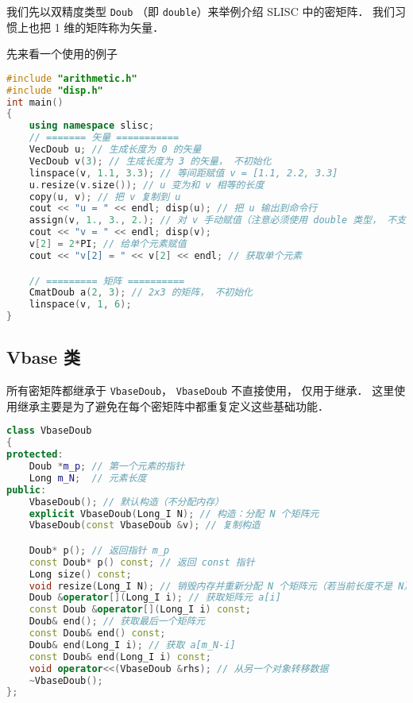 
\begin{issues}
\issueDraft
\end{issues}


我们先以双精度类型 \verb|Doub| （即 \verb|double|）来举例介绍 SLISC 中的密矩阵． 我们习惯上也把 1 维的矩阵称为矢量．

先来看一个使用的例子
\begin{lstlisting}[language=cpp]
#include "arithmetic.h"
#include "disp.h"
int main()
{
    using namespace slisc;
    // ======= 矢量 ===========
    VecDoub u; // 生成长度为 0 的矢量
    VecDoub v(3); // 生成长度为 3 的矢量， 不初始化
    linspace(v, 1.1, 3.3); // 等间距赋值 v = [1.1, 2.2, 3.3]
    u.resize(v.size()); // u 变为和 v 相等的长度
    copy(u, v); // 把 v 复制到 u
    cout << "u = " << endl; disp(u); // 把 u 输出到命令行
    assign(v, 1., 3., 2.); // 对 v 手动赋值（注意必须使用 double 类型， 不支持自动转换）
    cout << "v = " << endl; disp(v);
    v[2] = 2*PI; // 给单个元素赋值
    cout << "v[2] = " << v[2] << endl; // 获取单个元素

    // ========= 矩阵 ==========
    CmatDoub a(2, 3); // 2x3 的矩阵， 不初始化
    linspace(v, 1, 6); 
}
\end{lstlisting}

\subsection{Vbase 类}
所有密矩阵都继承于 \verb|VbaseDoub|， \verb|VbaseDoub| 不直接使用， 仅用于继承． 这里使用继承主要是为了避免在每个密矩阵中都重复定义这些基础功能．
\begin{lstlisting}[language=cpp]
class VbaseDoub
{
protected:
    Doub *m_p; // 第一个元素的指针
    Long m_N;  // 元素长度
public:
    VbaseDoub(); // 默认构造（不分配内存）
    explicit VbaseDoub(Long_I N); // 构造：分配 N 个矩阵元
    VbaseDoub(const VbaseDoub &v); // 复制构造

    Doub* p(); // 返回指针 m_p
    const Doub* p() const; // 返回 const 指针
    Long size() const;
    void resize(Long_I N); // 销毁内存并重新分配 N 个矩阵元（若当前长度不是 N）
    Doub &operator[](Long_I i); // 获取矩阵元 a[i]
    const Doub &operator[](Long_I i) const; 
    Doub& end(); // 获取最后一个矩阵元
    const Doub& end() const;
    Doub& end(Long_I i); // 获取 a[m_N-i]
    const Doub& end(Long_I i) const;
    void operator<<(VbaseDoub &rhs); // 从另一个对象转移数据
    ~VbaseDoub();
};
\end{lstlisting}

